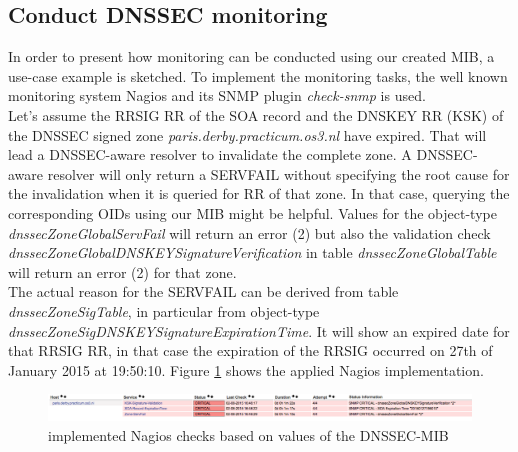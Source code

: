 \subsection{Conduct DNSSEC monitoring}
\label{section:conduct-dnssec-monitoring}
In order to present how monitoring can be conducted using our created MIB, a use-case example is sketched. To implement the monitoring tasks, the well known monitoring system Nagios \cite{nagios} and its SNMP plugin \textit{check-snmp} \cite{check-snmp} is used.
\\
Let's assume the RRSIG RR of the SOA record and the DNSKEY RR (KSK) of the DNSSEC signed zone \textit{paris.derby.practicum.os3.nl} have expired. That will lead a DNSSEC-aware resolver to invalidate the complete zone. A DNSSEC-aware resolver will only return a SERVFAIL without specifying the root cause for the invalidation when it is queried for RR of that zone. In that case, querying the corresponding OIDs using our MIB might be helpful. Values for the object-type \textit{ dnssecZoneGlobalServFail} will return an error (2) but also the validation check \textit{dnssecZoneGlobalDNSKEYSignatureVerification} in table \textit{dnssecZoneGlobalTable} will return an error (2) for that zone. 
\\
The actual reason for the SERVFAIL can be derived from table \textit{ dnssecZoneSigTable}, in particular from object-type \textit{ dnssecZoneSigDNSKEYSignatureExpirationTime}. It will show an expired date for that RRSIG RR, in that case the expiration of the RRSIG occurred on 27th of January 2015 at 19:50:10. Figure \ref{figure:nagios} shows the applied Nagios implementation.

\begin{figure}[H]
\centering
\includegraphics[scale=0.3]{Images/nagios.pdf}
\caption{implemented Nagios checks based on values of the DNSSEC-MIB}
\label{figure:nagios}
\end{figure}

